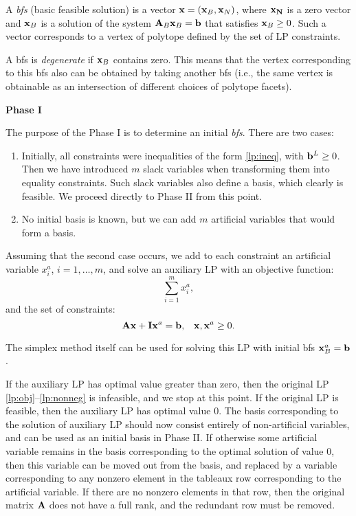 \documentclass[10pt]{article}
\begin{document}
A {\em bfs} (basic feasible solution) is a vector ${\bf x} = ({\bf x}_B, {\bf x}_N)$, where ${\bf x_N}$ is a zero vector and ${\bf x}_B$ is a solution of the system ${\bf A}_B {\bf x}_B = {\bf b}$ that satisfies ${\bf x}_B \geq 0$. Such a vector corresponds to a vertex of polytope defined by the set of LP constraints.

A bfs is {\em degenerate} if ${\bf x}_B$ contains zero. This means that the vertex corresponding to this bfs also can be obtained by taking another bfs (i.e., the same vertex is obtainable as an intersection of different choices of polytope facets).


\medskip
{\bf Phase I}

The purpose of the Phase I is to determine an initial {\em bfs}. There are two cases:
\begin{enumerate}
	\item Initially, all constraints were inequalities of the form \eqref{lp:ineq}, with ${\bf b}^L \geq 0$. Then we have introduced $m$ slack variables when transforming them into equality constraints. Such slack variables also define a basis, which clearly is feasible. We proceed directly to Phase II from this point.
	\item No initial basis is known, but we can add $m$ artificial variables that would form a basis.
\end{enumerate}

Assuming that the second case occurs, we add to each constraint an artificial variable $x^{a}_i$, $i = 1, \ldots, m$, and solve an auxiliary LP with an objective function:
$$
	\sum_{i=1}^m x^{a}_i,
$$
and the set of constraints:
$$
	{\bf A} {\bf x} + {\bf I} {\bf x}^a = {\bf b}, \;\;\; {\bf x}, {\bf x}^a \geq 0.
$$

The simplex method itself can be used for solving this LP with initial bfs ${\bf x}^a_B = {\bf b}$.

If the auxiliary LP has optimal value greater than zero, then the original LP \eqref{lp:obj}--\eqref{lp:nonneg} is infeasible, and we stop at this point.
If the original LP is feasible, then the auxiliary LP has optimal value $0$. The basis corresponding to the solution of auxiliary LP should now consist entirely of non-artificial variables, and can be used as an initial basis in Phase II. If otherwise some artificial variable remains in the basis corresponding to the optimal solution of value $0$, then this variable can be moved out from the basis, and replaced by a variable corresponding to any nonzero element in the tableaux row corresponding to the artificial variable. If there are no nonzero elements in that row, then the original matrix ${\bf A}$ does not have a full rank, and the redundant row must be removed.
\end{document}
